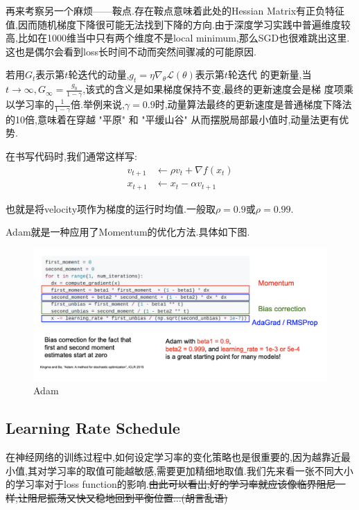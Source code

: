 再来考察另一个麻烦------鞍点.存在鞍点意味着此处的Hessian Matrix有正负特征值,因而随机梯度下降很可能无法找到下降的方向.由于深度学习实践中普遍维度较高,比如在1000维当中只有两个维度不是local minimum,那么SGD也很难跳出这里.这也是偶尔会看到loss长时间不动而突然间骤减的可能原因.

若用$G_{t}$表示第$t$轮迭代的动量,$g_{t}=\eta \nabla_{\theta} \mathcal L(\theta)$表示第$t$轮迭代 的更新量,当$t \rightarrow \infty , G_{\infty}=\frac{g_{0}}{1-\gamma}$,该式的含义是如果梯度保持不变,最终的更新速度会是梯 度项乘以学习率的$\frac{1}{1-\gamma}$倍.举例来说,$\gamma=0.9$时,动量算法最终的更新速度是普通梯度下降法 的10倍,意味着在穿越 "平原" 和 "平缓山谷" 从而摆脱局部最小值时,动量法更有优势.

在书写代码时,我们通常这样写:
\begin{equation}
	\begin{aligned}
		v_{t+1} &\leftarrow \rho v_{t} + \nabla f(x_t)
		\\
		x_{t+1} &\leftarrow x_t - \alpha v_{t+1}
	\end{aligned}
\end{equation}

也就是将velocity项作为梯度的运行时均值.一般取$\rho = 0.9$或$\rho = 0.99$.

Adam就是一种应用了Momentum的优化方法.具体如下图.

\begin{figure}[htbp]
	\centering
	\includegraphics[scale=0.65]{figures/adam.png}
	\caption{Adam}
	\label{}
\end{figure}

\subsection{Learning Rate Schedule}
在神经网络的训练过程中,如何设定学习率的变化策略也是很重要的,因为越靠近最小值,其对学习率的取值可能越敏感,需要更加精细地取值.我们先来看一张不同大小的学习率对于loss function的影响.\sout{由此可以看出,好的学习率就应该像临界阻尼一样,让阻尼振荡又快又稳地回到平衡位置...(胡言乱语)}


